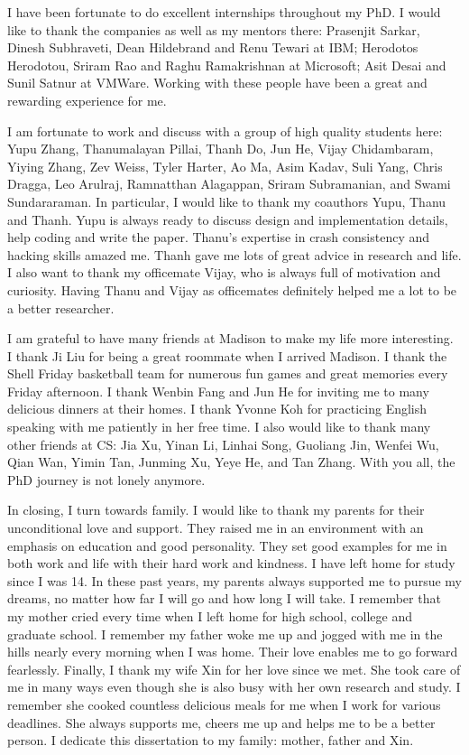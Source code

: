I have been fortunate to do excellent internships throughout my PhD. 
I would like to thank the companies as well as my mentors there: 
Prasenjit Sarkar, Dinesh Subhraveti, Dean Hildebrand and Renu Tewari
at IBM; Herodotos Herodotou, Sriram Rao and Raghu Ramakrishnan at
Microsoft; Asit Desai and Sunil Satnur at VMWare. Working with these
people have been a great and rewarding experience for me. 

I am fortunate to work and discuss with a group of high quality
students here: Yupu Zhang, Thanumalayan Pillai, Thanh Do, Jun He,
Vijay Chidambaram, Yiying Zhang, Zev Weiss, Tyler Harter, Ao Ma,
Asim Kadav, Suli Yang, Chris Dragga, Leo Arulraj, Ramnatthan
Alagappan, Sriram Subramanian, and Swami Sundararaman. In particular,
I would like to thank my coauthors Yupu, Thanu and Thanh. Yupu is
always ready to discuss design and implementation details, help coding
and write the paper. Thanu's expertise in crash consistency and
hacking skills amazed me. Thanh gave me lots of great advice in
research and life. I also want to thank my officemate Vijay, who is
always full of motivation and curiosity. Having Thanu and Vijay as
officemates definitely helped me a lot to be a better researcher.  

I am grateful to have many friends at Madison to make my life more
interesting. I thank Ji Liu for being a great roommate when I arrived 
Madison. I thank the Shell Friday basketball team for numerous fun
games and great memories every Friday afternoon. I thank Wenbin Fang
and Jun He for inviting me to many delicious dinners at their homes. I 
thank Yvonne Koh for practicing English speaking with me patiently in
her free time. I also would like to thank many other friends at CS:
Jia Xu, Yinan Li, Linhai Song, Guoliang Jin, Wenfei Wu, Qian Wan,
Yimin Tan, Junming Xu, Yeye He, and Tan Zhang. With you all, the PhD
journey is not lonely anymore.   

In closing, I turn towards family. I would like to thank my
parents for their unconditional love and support. They raised me in an
environment with an emphasis on education and good personality. They
set good examples for me in both work and life with their hard work 
and kindness. I have left home for study since I was 14. In these past
years, my parents always supported me to pursue my dreams, no matter how
far I will go and how long I will take. I remember that my mother
cried every time when I left home for high school, college and
graduate school. I remember my father woke me up and jogged with me
in the hills nearly every morning when I was home. Their love enables
me to go forward fearlessly. Finally, I thank my wife Xin for
her love since we met. She took care of me in many ways even though she is also
busy with her own research and study. I remember she cooked countless 
delicious meals for me when I work for various deadlines. She always
supports me, cheers me up and helps me to be a better person. I
dedicate this dissertation to my family: mother, father and Xin.  
